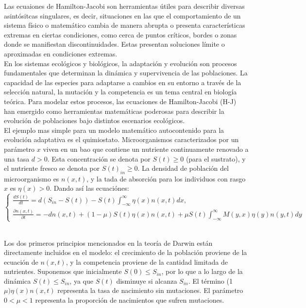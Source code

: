 {            \normalsize{\citep{Barles2006} Las ecuaiones de Hamilton-Jacobi son herramientas útiles para describir diversas asintósitcas singulares, es decir, situaciones en las que el comportamiento de un sistema físico o matemático cambia  de manera abrupta o presenta características extremas en ciertas condiciones, como cerca de puntos críticos, bordes o zonas donde se manifiestan discontinuidades. Estas presentan soluciones límite o aproximadas en condiciones extremas.
            }\\

            \normalsize{En los sistemas ecológicos y biológicos, la adaptación y evolución son procesos fundamentales que determinan la dinámica y supervivencia de las poblaciones. La capacidad de las especies para adaptarse a cambios en su entorno a través de la selección natural, la mutación y la competencia es un tema central en biología teórica. Para modelar estos procesos, las ecuaciones de Hamilton-Jacobi (H-J) han emergido como herramientas matemáticas poderosas para describir la evolución de poblaciones bajo distintos escenarios ecológicos.}\\

    \normalsize{\citep{Mirrahimi}El ejemplo mas simple para un modelo matemático autocontenido para la evolución adaptativa es el quimiostato. Microorganismos caracterizados por un parámetro $x$} viven en un bao que contiene un nutriente continuamente renovado a una tasa $d>0$. Esta concentración se denota por $S(t)\geq0$ (para el sustrato), y el nutriente fresco se denota por $S(t)_{in}\geq0$. La densidad de población del microorganismo es $n(x,t)$, y la tada de absorción para los individuos con rasgo $x$ es $\eta(x)>0$. Dando así las ecuaciónes:\\

            \begin{equation*}
                \left\{\begin{array}{l}
                \frac{d S(t)}{d t}=d\left(S_{i n}-S(t)\right)-S(t) \int_{-\infty}^{\infty} \eta(x) n(x, t) d x, \\
                \frac{\partial n(x, t)}{\partial t}=-d n(x, t)+(1-\mu) S(t) \eta(x) n(x, t)+\mu S(t) \int_{-\infty}^{\infty} M(y, x) \eta(y) n(y, t) d y
                \end{array}\right.
            \end{equation*}\\

    \normalsize{Los dos primeros principios mencionados en la teoría de Darwin están directamente incluidos en el modelo: el crecimiento de la población proviene de la ecuación de $n(x, t)$, y la competencia proviene de la cantidad limitada de nutrientes. Suponemos que inicialmente $S(0) \leq S_{i n}$, por lo que a lo largo de la dinámica $S(t) \leq S_{i n}$, ya que $S(t)$ disminuye si alcanza $S_{i n}$. El término (1$\mu) \eta(x) n(x, t)$ representa la tasa de nacimiento sin mutaciones. El parámetro $0<\mu<1$ representa la proporción de nacimientos que sufren mutaciones.
    
}}
